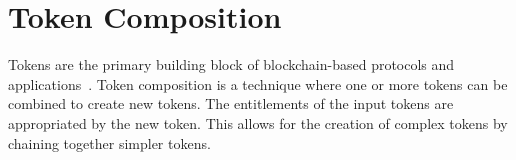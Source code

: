 \section{Token Composition}\label{sec:token-composition}

Tokens are the primary building block of blockchain-based protocols
and applications~\cite{voshmgir-20}.  Token composition is a technique
where one or more tokens can be combined to create new tokens.  The
entitlements of the input tokens are appropriated by the new token.
This allows for the creation of complex tokens by chaining together
simpler tokens.
